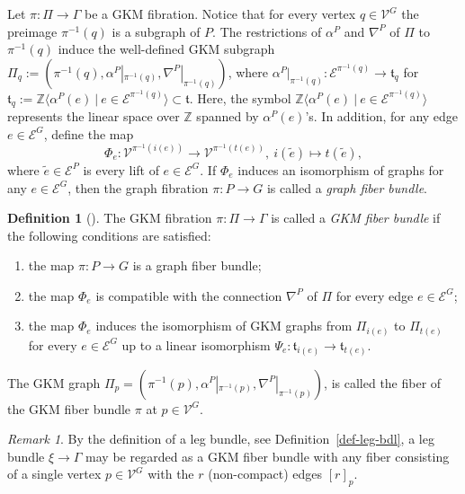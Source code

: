 \documentclass[12pt]{amsart}
\theoremstyle{definition}
\newtheorem{definition}[theorem]{Definition}
\theoremstyle{remark}
\newtheorem{remark}[theorem]{Remark}
\numberwithin{equation}{section}
\begin{document}
Let $\pi\colon \Pi\to \Gamma$ be a GKM fibration.
Notice that for every vertex $q\in \mathcal{V}^{G}$ the preimage $\pi^{-1}(q)$ is a subgraph of $P$.
The restrictions of $\alpha^{P}$ and $\nabla^{P}$ of $\Pi$ to $\pi^{-1}(q)$ induce the well-defined GKM subgraph $\Pi_{q}:=(\pi^{-1}(q), \alpha^{P}|_{\pi^{-1}(q)},\nabla^{P}|_{\pi^{-1}(q)})$, where $\alpha^{P}|_{\pi^{-1}(q)}:\mathcal{E}^{\pi^{-1}(q)}\to \mathfrak{t}_{q}$ for
$\mathfrak{t}_{q}:=\mathbb{Z}\langle \alpha^{P}(e)\ |\ e\in \mathcal{E}^{\pi^{-1}(q)} \rangle\subset \mathfrak{t}$.
Here, the symbol $\mathbb{Z}\langle \alpha^{P}(e)\ |\ e\in \mathcal{E}^{\pi^{-1}(q)} \rangle$
represents the linear space over $\mathbb{Z}$ spanned by $\alpha^{P}(e)$'s.
In addition, for any edge $e\in \mathcal{E}^{G}$, define the map
\[
\Phi_{e}\colon \mathcal{V}^{\pi^{-1}(i(e))}\to \mathcal{V}^{\pi^{-1}(t(e))},\ i(\widetilde{e})\mapsto t(\widetilde{e}),
\]
where $\widetilde{e}\in \mathcal{E}^{P}$ is every lift of $e\in \mathcal{E}^{G}$.
If $\Phi_{e}$ induces an isomorphism of graphs for any $e\in \mathcal{E}^{G}$,
then the graph fibration $\pi:P\to G$ is called  a \textit{graph fiber bundle}.


\begin{definition}[\cite{GSZ}]
\label{defn:gsz2}
The GKM fibration $\pi:\Pi\to \Gamma$ is called a \textit{GKM fiber bundle} if the following conditions are satisfied:
\begin{enumerate}[label=(\roman*)]
\item the map $\pi:P\to G$ is a graph fiber bundle;
\item the map $\Phi_{e}$ is compatible with the connection $\nabla^{P}$ of $\Pi$ for every edge $e\in \mathcal{E}^{G}$;
\item the map $\Phi_{e}$ induces the isomorphism of GKM graphs from $\Pi_{i(e)}$ to $\Pi_{t(e)}$ for every $e\in \mathcal{E}^{G}$ up to a linear isomorphism $\Psi_{e}\colon \mathfrak{t}_{i(e)}\to \mathfrak{t}_{t(e)}$.
\end{enumerate}
The GKM graph $\Pi_{p}=(\pi^{-1}(p),\alpha^{P}|_{\pi^{-1}(p)},\nabla^{P}|_{\pi^{-1}(p)})$, is called the fiber of the GKM fiber bundle $\pi$ at $p\in \mathcal{V}^{G}$.
\end{definition}

\begin{remark}
By the definition of a leg bundle, see Definition~\ref{def-leg-bdl}, a leg bundle $\xi\to\Gamma$ may be regarded as a GKM fiber bundle with any fiber consisting of a single vertex $p\in \mathcal{V}^{G}$ with the $r$ (non-compact) edges $[r]_{p}$.
\end{remark}
\end{document}
